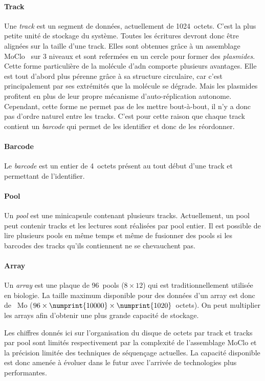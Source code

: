 \documentclass[a4paper]{report}
\begin{document}
\paragraph{Track} Une \emph{track} est un segment de données, actuellement de 1024~octets.
C'est la plus petite unité de stockage du système.
Toutes les écritures devront donc être alignées sur la taille d'une track.
Elles sont obtenues grâce à un assemblage MoClo~\cite{werner2012fast} sur 3 niveaux
et sont refermées en un cercle pour former des \emph{plasmides}.
Cette forme particulière de la molécule d'\ac{adn} comporte plusieurs avantages.
Elle est tout d'abord plus pérenne grâce à sa structure circulaire,
car c'est principalement par ses extrémités que la molécule se dégrade.
Mais les plasmides profitent en plus de leur propre mécanisme d'auto-réplication autonome.
Cependant, cette forme ne permet pas de les mettre bout-à-bout,
il n'y a donc pas d'ordre naturel entre les tracks.
C'est pour cette raison que chaque track contient un \emph{barcode} qui permet de les identifier et donc de les réordonner.

\paragraph{Barcode} Le \emph{barcode} est un entier de 4~octets présent au tout début d'une track et permettant de l'identifier.

\paragraph{Pool} Un \emph{pool} est une minicapsule contenant plusieurs tracks.
Actuellement, un pool peut contenir  tracks et les lectures sont réalisées par pool entier.
Il est possible de lire plusieurs pools en même temps
et même de fusionner des pools si les barcodes des tracks qu'ils contiennent ne se chevauchent pas.

\paragraph{Array} Un \emph{array} est une plaque de 96~pools ($8\times12$) qui est traditionnellement utilisée en biologie.
La taille maximum disponible pour des données d’un array est donc de ~Mo ($96\times\numprint{10000}\times\numprint{1020}$~octets).
On peut multiplier les arrays afin d'obtenir une plus grande capacité de stockage.

Les chiffres donnés ici sur l’organisation du disque de  octets par track et  tracks par pool sont limités respectivement par la complexité de l'assemblage MoClo et la précision limitée des techniques de séquençage actuelles.
La capacité disponible est donc amenée à évoluer dans le futur avec l'arrivée de technologies plus performantes.
\end{document}
